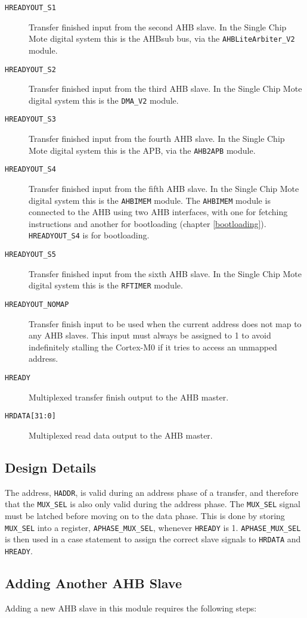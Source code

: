 \begin{description}
	\item[\texttt{HREADYOUT\_S1}] Transfer finished input from the second AHB slave. In the Single Chip Mote digital system this is the AHBsub bus, via the \texttt{AHBLiteArbiter\_V2} module.
	\item[\texttt{HREADYOUT\_S2}] Transfer finished input from the third AHB slave. In the Single Chip Mote digital system this is the \texttt{DMA\_V2} module.
	\item[\texttt{HREADYOUT\_S3}] Transfer finished input from the fourth AHB slave. In the Single Chip Mote digital system this is the APB, via the \texttt{AHB2APB} module.
	\item[\texttt{HREADYOUT\_S4}] Transfer finished input from the fifth AHB slave. In the Single Chip Mote digital system this is the \texttt{AHBIMEM} module. The \texttt{AHBIMEM} module is connected to the AHB using two AHB interfaces, with one for fetching instructions and another for bootloading (chapter \ref{bootloading}). \texttt{HREADYOUT\_S4} is for bootloading.
	\item[\texttt{HREADYOUT\_S5}] Transfer finished input from the sixth AHB slave. In the Single Chip Mote digital system this is the \texttt{RFTIMER} module.
	\item[\texttt{HREADYOUT\_NOMAP}] Transfer finish input to be used when the current address does not map to any AHB slaves. This input must always be assigned to 1 to avoid indefinitely stalling the Cortex-M0 if it tries to access an unmapped address.
	\item[\texttt{HREADY}] Multiplexed transfer finish output to the AHB master.
	\item[\texttt{HRDATA[31:0]}] Multiplexed read data output to the AHB master.
\end{description}

\subsection{Design Details}
The address, \texttt{HADDR}, is valid during an address phase of a transfer, and therefore that the \texttt{MUX\_SEL} is also only valid during the address phase. The \texttt{MUX\_SEL} signal must be latched before moving on to the data phase. This is done by storing \texttt{MUX\_SEL} into a register, \texttt{APHASE\_MUX\_SEL}, whenever \texttt{HREADY} is 1. \texttt{APHASE\_MUX\_SEL} is then used in a case statement to assign the correct slave signals to \texttt{HRDATA} and \texttt{HREADY}.

\subsection{Adding Another AHB Slave}
Adding a new AHB slave in this module requires the following steps:

